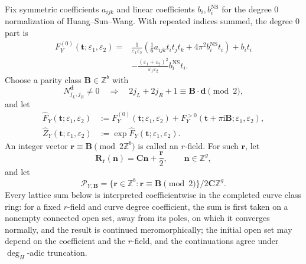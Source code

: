 \documentclass{amsart}
\theoremstyle{definition}
\numberwithin{equation}{section}
\newcommand{\Z}{\mathbb Z}
\newcommand{\eps}{\varepsilon}
\begin{document}
Fix symmetric coefficients \(a_{ijk}\) and linear coefficients \(b_i,b_i^{\mathrm{NS}}\) for the degree \(0\) normalization of Huang--Sun--Wang.  With repeated indices summed, the degree \(0\) part is
\begin{equation}
\begin{aligned}
 F_Y^{(0)}(\mathbf t;\eps_1,\eps_2)
 ={}&\frac1{\eps_1\eps_2}
 \left(\frac16a_{ijk}t_it_jt_k
       +4\pi^2b_i^{\mathrm{NS}}t_i\right)
 +b_it_i\\
 &-\frac{(\eps_1+\eps_2)^2}{\eps_1\eps_2}
 b_i^{\mathrm{NS}}t_i.
\end{aligned}
\label{eq:general-HSW-perturbative}
\end{equation}
Choose a parity class \(\mathbf B\in\Z^b\) with
\begin{equation}
 N^{\mathbf d}_{j_L,j_R}\ne0
 \quad\Longrightarrow\quad
 2j_L+2j_R+1\equiv\mathbf B\cdot\mathbf d\pmod2,
\label{eq:general-parity-class}
\end{equation}
and let
\begin{equation}
\begin{aligned}
 \widehat F_Y(\mathbf t;\eps_1,\eps_2)
 &:=F_Y^{(0)}(\mathbf t;\eps_1,\eps_2)
 +F_Y^{>0}(\mathbf t+\pi\mathrm{i}\mathbf B;
                     \eps_1,\eps_2),\\
 \widehat Z_Y(\mathbf t;\eps_1,\eps_2)
 &:=\exp\widehat F_Y(\mathbf t;\eps_1,\eps_2).
\end{aligned}
\label{eq:general-twisted-partition}
\end{equation}
An integer vector \(\mathbf r\equiv\mathbf B\pmod{2\Z^b}\) is called an \(r\)-field.  For such \(\mathbf r\), let
\begin{equation}
 \mathbf R_{\mathbf r}(\mathbf n)
 =\mathbf C\mathbf n+\frac{\mathbf r}{2},
 \qquad \mathbf n\in\Z^g,
\label{eq:general-R-field}
\end{equation}
and let
\begin{equation}
 \mathcal P_{Y,\mathbf B}
 =\{\mathbf r\in\Z^b:\mathbf r\equiv\mathbf B\pmod2\}
   \big/2\mathbf C\Z^g.
 \label{eq:general-parity-quotient}
\end{equation}
Every lattice sum below is interpreted coefficientwise in the completed curve class ring: for a fixed \(r\)-field and curve degree coefficient, the sum is first taken on a nonempty connected open set, away from its poles, on which it converges normally, and the result is continued meromorphically; the initial open set may depend on the coefficient and the \(r\)-field, and the continuations agree under \(\deg_H\)-adic truncation.
\end{document}
